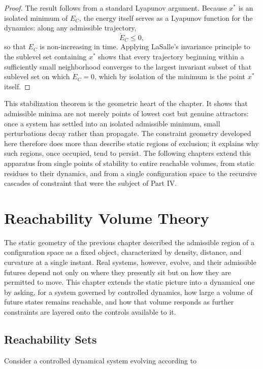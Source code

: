 \documentclass[11pt,oneside]{book}
\theoremstyle{plain}
\theoremstyle{definition}
\theoremstyle{remark}
\begin{document}
\begin{proof}
The result follows from a standard Lyapunov argument. Because \(x^\ast\) is an isolated minimum of \(E_C\), the energy itself serves as a Lyapunov function for the dynamics: along any admissible trajectory,
\[
\dot E_C\le0,
\]
so that \(E_C\) is non-increasing in time. Applying LaSalle's invariance principle to the sublevel set containing \(x^\ast\) shows that every trajectory beginning within a sufficiently small neighborhood converges to the largest invariant subset of that sublevel set on which \(\dot E_C=0\), which by isolation of the minimum is the point \(x^\ast\) itself.
\end{proof}

This stabilization theorem is the geometric heart of the chapter. It shows that admissible minima are not merely points of lowest cost but genuine attractors: once a system has settled into an isolated admissible minimum, small perturbations decay rather than propagate. The constraint geometry developed here therefore does more than describe static regions of exclusion; it explains why such regions, once occupied, tend to persist. The following chapters extend this apparatus from single points of stability to entire reachable volumes, from static residues to their dynamics, and from a single configuration space to the recursive cascades of constraint that were the subject of Part IV.

\chapter{Reachability Volume Theory}

The static geometry of the previous chapter described the admissible region of a configuration space as a fixed object, characterized by density, distance, and curvature at a single instant. Real systems, however, evolve, and their admissible futures depend not only on where they presently sit but on how they are permitted to move. This chapter extends the static picture into a dynamical one by asking, for a system governed by controlled dynamics, how large a volume of future states remains reachable, and how that volume responds as further constraints are layered onto the controls available to it.

\section{Reachability Sets}

Consider a controlled dynamical system evolving according to
\end{document}
